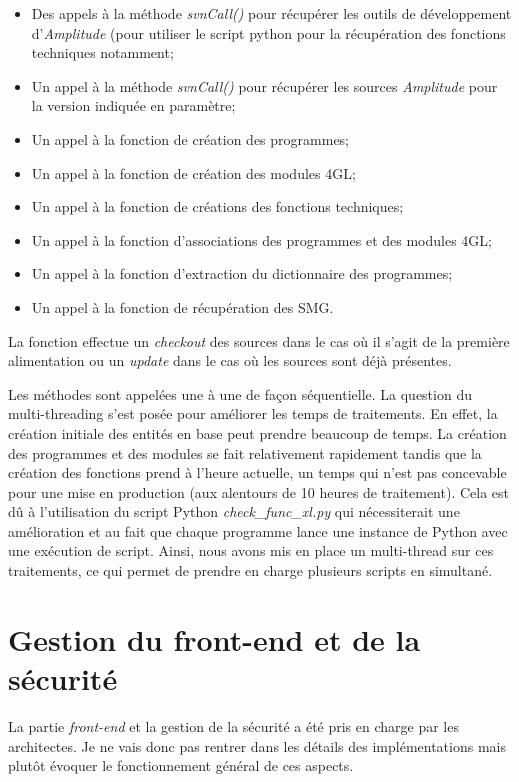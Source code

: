\documentclass{polytech/polytech}
\begin{document}
\begin{itemize}
	\item Des appels à la méthode \textit{svnCall()} pour récupérer les outils de développement d'\textit{Amplitude} (pour utiliser le script python pour la récupération des fonctions techniques notamment;
	\item Un appel à la méthode \textit{svnCall()} pour récupérer les sources \textit{Amplitude} pour la version indiquée en paramètre;
	\item Un appel à la fonction de création des programmes;
	\item Un appel à la fonction de création des modules 4GL;
	\item Un appel à la fonction de créations des fonctions techniques;
	\item Un appel à la fonction d'associations des programmes et des modules 4GL;
	\item Un appel à la fonction d'extraction du dictionnaire des programmes;
	\item Un appel à la fonction de récupération des SMG.
\end{itemize}

La fonction  effectue un \textit{checkout} des sources dans le cas où il s'agit de la première alimentation ou un \textit{update} dans le cas où les sources sont déjà présentes. 

Les méthodes sont appelées une à une de façon séquentielle. La question du multi-threading s'est posée pour améliorer les temps de traitements. En effet, la création initiale des entités en base peut prendre beaucoup de temps. La création des programmes et des modules se fait relativement rapidement tandis que la création des fonctions prend à l'heure actuelle, un temps qui n'est pas concevable pour une mise en production (aux alentours de 10 heures de traitement). Cela est dû à l'utilisation du script Python \textit{check\_func\_xl.py} qui nécessiterait une amélioration et au fait que chaque programme lance une instance de Python avec une exécution de script. Ainsi, nous avons mis en place un multi-thread sur ces traitements, ce qui permet de prendre en charge plusieurs scripts en simultané. 


\chapter{Gestion du front-end et de la sécurité}
\label{chap:frontEnd}

La partie \textit{front-end} et la gestion de la sécurité a été pris en charge par les architectes. Je ne vais donc pas rentrer dans les détails des implémentations mais plutôt évoquer le fonctionnement général de ces aspects.
\end{document}
